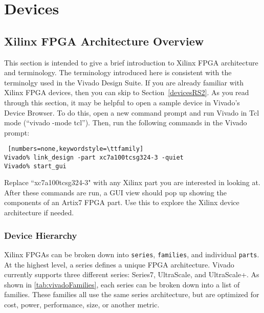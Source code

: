 \newpage
\section{Devices}
\graphicspath{{./techReportFigures/sec4_devices/}}

\subsection{Xilinx FPGA Architecture Overview} \label{fpgaArch}
This section is intended to give a brief introduction to Xilinx FPGA
architecture and terminology. The terminology introduced here is consistent
with the terminolgy used in the Vivado Design Suite. If you are already familiar
with Xilinx FPGA devices, then you can skip to Section~\ref{devicesRS2}. 
As you read through this section, it may be helpful to open a sample device in Vivado's
Device Browser. To do this, open a new command prompt and run Vivado in Tcl mode
(``vivado -mode tcl''). Then, run the following commands in the Vivado prompt:

\begin{lstlisting} [numbers=none,keywordstyle=\ttfamily]
Vivado% link_design -part xc7a100tcsg324-3 -quiet
Vivado% start_gui
\end{lstlisting}

\noindent
Replace ``xc7a100tcsg324-3" with any Xilinx part you are interested in looking
at. After these commands are run, a GUI view should pop up showing the
components of an Artix7 FPGA part. Use this to explore the Xilinx device 
architecture if needed.

\subsubsection{Device Hierarchy} \label{sec:deviceHierarchy}
Xilinx FPGAs can be broken down into \texttt{series},
\texttt{families}, and individual \texttt{parts}. At the highest level, a series
defines a unique FPGA architecture. Vivado currently supports three different
series: Series7, UltraScale, and UltraScale+. As shown in
\autoref{tab:vivadoFamilies}, each series can be broken down into a list of
families. These families all use the same series architecture, but are
optimized for cost, power, performance, size, or another metric.

